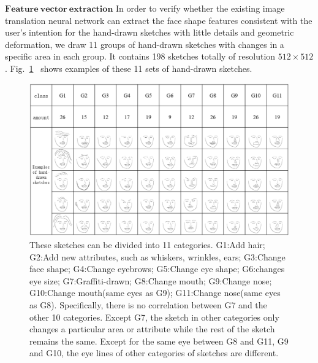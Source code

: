 \documentclass[10pt,twocolumn,letterpaper]{article}
\begin{document}
\noindent
$\mathbf{Feature ~vector ~extraction}$ In order to verify whether the existing image translation neural network can extract the face shape features consistent with the user's intention for the hand-drawn sketches with little details and geometric deformation, we draw 11 groups of hand-drawn sketches with changes in a specific area in each group. It contains 198 sketches totally of resolution $512\times512$. Fig.~\ref{fig:hand_drawn_contours}~ shows examples of these 11 sets of hand-drawn sketches.  
\begin{figure}[htbp]
	\centering
	\includegraphics[width=0.9 \textwidth]{hand_drawn_sketches.png}
	\caption{These sketches can be divided into 11 categories. G1:Add hair; G2:Add new attributes, such as whiskers, wrinkles, ears; G3:Change face shape; G4:Change eyebrows; G5:Change eye shape; G6:changes eye size; G7:Graffiti-drawn; G8:Change mouth; G9:Change nose; G10:Change mouth(same eyes as G9); G11:Change nose(same eyes as G8). Specifically, there is no correlation between G7 and the other 10 categories. Except G7, the sketch in other categories only changes a particular area or attribute while the rest of the sketch remains the same. Except for the same eye between G8 and G11, G9 and G10, the eye lines of other categories of sketches are different.}
	\label{fig:hand_drawn_contours}
\end{figure}
\end{document}
